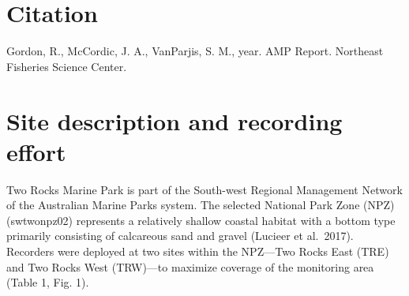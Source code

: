 \documentclass[
  letterpaper,
  oneside,
  open=any]{scrbook}
\renewcommand*\contentsname{Table of contents}
\newcommand\contentsname{Table of contents}
\begin{document}
\begin{frontmatter}
\begin{titlepage}
\begin{minipage}[b][\textheight][s]{\minipagewidth}
\titleblock

\authorblock

\affiliationblock

\vfill

\logoblock

\footerblock
\par

\end{minipage}
\clearpage
\restoregeometry
\end{titlepage}
\setcounter{page}{1}
\end{frontmatter}


\renewcommand*\contentsname{Table of contents}
{
\setcounter{tocdepth}{1}
\tableofcontents
}
\listoffigures
\listoftables
\mainmatter
{}

\chapter*{Citation}\label{citation}


Gordon, R., McCordic, J. A., VanParjis, S. M., year. AMP Report.
Northeast Fisheries Science Center.


\chapter{Site description and recording
effort}\label{site-description-and-recording-effort}

Two Rocks Marine Park is part of the South-west Regional Management
Network of the Australian Marine Parks system. The selected National
Park Zone (NPZ) (swtwonpz02) represents a relatively shallow coastal
habitat with a bottom type primarily consisting of calcareous sand and
gravel (Lucieer et al.~2017). Recorders were deployed at two sites
within the NPZ---Two Rocks East (TRE) and Two Rocks West (TRW)---to
maximize coverage of the monitoring area (Table 1, Fig. 1).
\end{document}
